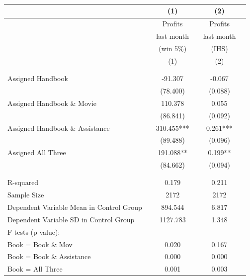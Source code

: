 \documentclass[hideothersubsections, usenames,dvipsnames,11pt]{beamer}
\begin{document}
\begin{frame}

\frametitle{}
{\scriptsize{\begin{table}[t]
\centering
\fontsize{5.7}{5.7}\selectfont
	\tabcolsep=0.10cm
	\begin{tabular}{l*{5}{c}}
\hline
&& (1) && (2) \\
\hline
			   &&\textcolor{bdf}{Profits}	        &&\textcolor{bdf}{Profits} \\
				&&\textcolor{bdf}{last month}  		&&\textcolor{bdf}{last month} \\
			&&(win 5\%)			&&(IHS) \\
				&&(1)				&&(2)	\\
&& \\
					\hline
&&\\
		

Assigned Handbook 					&&-91.307   	&& -0.067   		\\
       								 	&&         (78.400)  	&&          (0.088)  	\\

         							
Assigned Handbook \& Movie				&&110.378   	  	&& 0.055   		\\
       									&&         (86.841)  	&&          (0.092)  	\\

         							
Assigned Handbook \& Assistance 	&&         310.455***	&&           0.261***		\\
       								 	&&         (89.488) 	&&          (0.096)  	\\
         							
Assigned All Three          		&&         191.088**  	&&           0.199** 		\\
       								 	&&         (84.662)  	&&          (0.094)  	\\

   	\\
\hline         							
\\
R-squared											  	&& 0.179  	&& 0.211  	\\
Sample Size 											&&2172	&& 2172 	\\
Dependent Variable Mean in Control Group			 	&&          894.544   	&&           6.817 	\\
Dependent Variable SD in Control Group				 	&&         1127.783   	 &&          1.348  	\\
F-tests (p-value):											&&			&&			\\
\hspace{5mm}Book = Book \& Mov				        	&&    0.020   	&&            0.167 	\\
\hspace{5mm}Book = Book \& Assistance				  			&&0.000   	&&0.000  	\\
\hspace{5mm}Book = All Three			   			  	&&0.001   	&&0.003  	\\
\hline
	\end{tabular}


\end{table}}}
\end{frame}
\end{document}
